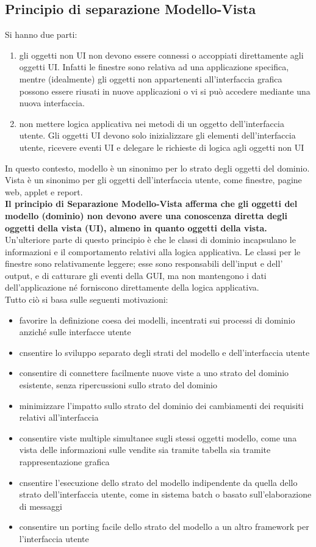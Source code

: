 \documentclass[a4paper,12pt, oneside]{book}
\begin{document}
\subsection{Principio di separazione Modello-Vista }
Si hanno due parti:
\begin{enumerate}
\item gli oggetti non UI non devono essere connessi o accoppiati direttamente agli
oggetti UI. Infatti le finestre sono relativa ad una applicazione
specifica, mentre (idealmente) gli oggetti non appartenenti all'interfaccia grafica
possono essere riusati in nuove applicazioni o vi si può accedere mediante una
nuova interfaccia.
\item non mettere logica applicativa nei metodi di un oggetto dell'interfaccia utente.
  Gli oggetti UI devono solo inizializzare gli elementi dell'interfaccia utente, ricevere eventi UI e delegare le richieste di logica agli oggetti non UI
\end{enumerate}
In questo contesto, modello è un sinonimo per lo strato degli oggetti del dominio.
Vista è un sinonimo per gli oggetti
dell'interfaccia utente, come finestre, pagine web, applet e report.\\
\textbf{Il principio di Separazione Modello-Vista afferma che gli oggetti del modello (dominio) non devono avere una conoscenza diretta degli oggetti della vista (UI), almeno in
  quanto oggetti della vista.}\\
Un'ulteriore parte di questo principio è che le classi di dominio incapsulano le informazioni e il comportamento relativi alla logica applicativa. Le classi per le finestre sono relativamente leggere; esse sono responsabili dell'input e dell' output, e di catturare gli eventi
della GUI, ma non mantengono i dati dell'applicazione né forniscono direttamente della
logica applicativa.\\
Tutto ciò si basa sulle seguenti motivazioni:
\begin{itemize}
\item favorire la definizione coesa dei modelli, incentrati sui processi di dominio anziché
  sulle interfacce utente
\item cnsentire lo sviluppo separato degli strati del modello e dell'interfaccia utente
\item consentire di connettere facilmente nuove viste a uno strato del dominio esistente,
  senza ripercussioni sullo strato del dominio
\item minimizzare l'impatto sullo strato del dominio dei cambiamenti dei requisiti relativi all'interfaccia
\item consentire viste multiple simultanee sugli stessi oggetti modello, come una vista
delle informazioni sulle vendite sia tramite tabella sia tramite rappresentazione
grafica
\item cnsentire l'esecuzione dello strato del modello indipendente da quella dello strato
dell'interfaccia utente, come in sistema batch o basato sull'elaborazione di messaggi
\item consentire un porting facile dello strato del modello a un altro framework per l'interfaccia utente
\end{itemize}
\end{document}
